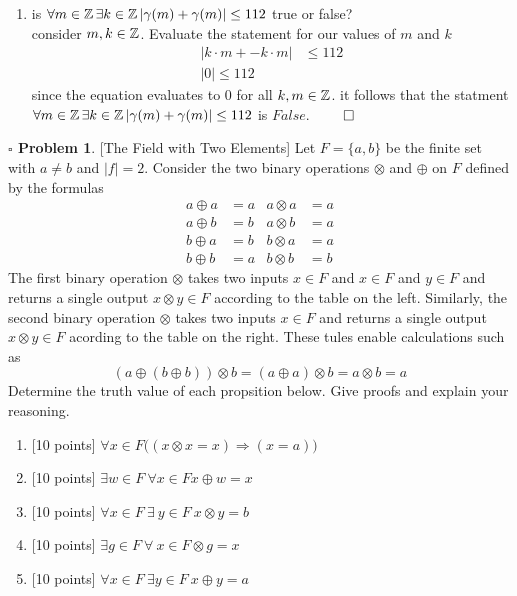 \documentclass[11pt,twoside]{amsart}
\theoremstyle{definition}
\newtheorem{bprob}{$\square$ Problem}
\begin{document}
\begin{enumerate}[label= 1.\arabic*, itemsep=0.4cm]
        \item %
          is $\forall m \in \operatorname*{\mathbb{Z}} \exists k \in \operatorname*{\mathbb{Z}} | \gamma(m) + \gamma(m)| \leq 112$ true or false?\\
           consider $m,k\in \operatorname*{\mathbb{Z}}$. Evaluate the statement for our values of $m$ and $k$ 
          \begin{align*}
            |k \cdot m + -k \cdot m| &\leq 112\\
            |0| \leq 112
          \end{align*}
          since the equation evaluates to 0 for all $k,m \in \operatorname*{\mathbb{Z}}$. it follows that the statment $\forall m \in \operatorname*{\mathbb{Z}} \exists k \in \operatorname*{\mathbb{Z}} | \gamma(m) + \gamma(m)| \leq 112$ is $False$. $\qed$

      

    \end{enumerate}
\newpage
\begin{bprob} %
  {[The Field with Two Elements]} Let $F = \{ a,b\}$ be the finite set with $a \neq b$ and $|f| = 2$. Consider the two binary operations $\otimes$ and $\oplus$ on $F$ defined by the formulas 
  \begin{align*}
    a \oplus a &= a     &a \otimes a &= a \\
    a \oplus b &= b     &a \otimes b &= a \\
    b \oplus a &= b     &b \otimes a &= a \\
    b \oplus b &= a     &b \otimes b &= b
  \end{align*}
  The first binary operation $\otimes$ takes two inputs $x \in F$ and $x \in F$ and $y \in F$ and returns a single output $x \otimes y \in F$ according to the table on the left. Similarly, the second binary operation $\otimes$ takes two inputs $x \in F$ and returns a single output $x \otimes y \in F$ acording to the table on the right. These tules enable calculations such as
  $$(a \oplus (b \oplus b)) \otimes b = (a \oplus a) \otimes b = a \otimes b = a$$
Determine the truth value of each propsition below. Give proofs and explain your reasoning. 
    \begin{enumerate}[label= 2.\arabic*, itemsep=0.2cm]
        \item %
          {[10 points]} $\forall x \in F \Big((x\otimes x = x) \Rightarrow (x = a) \Big)$
        \item %
          {[10 points]} $\exists w \in F \ \forall x \in F x \oplus w = x$
        \item %
          {[10 points]} $\forall x \in F \ \exists \ y \in F \ x \otimes y = b$
        \item %
          {[10 points]} $\exists g \in F \ \forall \ x \in F \otimes g = x $
        \item %
          {[10 points]} $\forall x \in F \ \exists y \in F \ x \oplus y = a $

    \end{enumerate}
\end{bprob}
\end{document}
